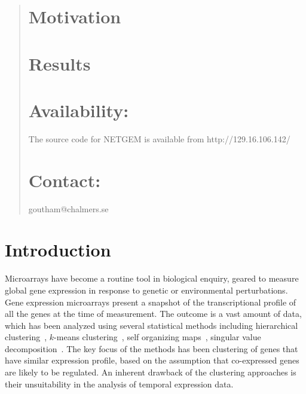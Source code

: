 \documentclass{bioinfo}
\begin{document}
\begin{abstract}
\section{Motivation}

\section{Results}

\section{Availability:}
The source code for NETGEM is available from http://129.16.106.142/

\section{Contact:} goutham@chalmers.se 
\end{abstract}

\section{Introduction}

Microarrays have become a routine tool in biological enquiry, geared to measure 
global gene expression in response to genetic or 
environmental perturbations. Gene expression microarrays present a
snapshot of the transcriptional profile of all the genes at the time
of measurement. The outcome is a
vast amount of data, which has been analyzed using several statistical
methods including hierarchical clustering~\citep{Eisen98}, $k$-means
clustering~\citep{Tavazoie99}, self organizing
maps~\citep{Tomoya99som}, singular value decomposition~\citep{DBLP:journals/bioinformatics/RifkinK02}.  The key focus of the methods has 
been clustering of genes that have similar expression profile, based
on the assumption that co-expressed genes are likely to be regulated. 
An inherent drawback of the clustering approaches is their
unsuitability in the analysis of temporal expression data.  

\end{document}
